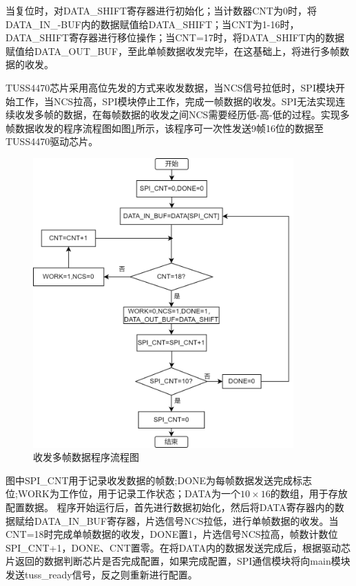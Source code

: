 当复位时，对DATA\_SHIFT寄存器进行初始化；当计数器CNT为0时，将DATA\_IN\_-BUF内的数据赋值给DATA\_SHIFT；当CNT为1-16时，DATA\_SHIFT寄存器进行移位操作；当CNT=17时，将DATA\_SHIFT内的数据赋值给DATA\_OUT\_BUF，至此单帧数据收发完毕，在这基础上，将进行多帧数据的收发。




TUSS4470芯片采用高位先发的方式来收发数据，当NCS信号拉低时，SPI模块开始工作，当NCS拉高，SPI模块停止工作，完成一帧数据的收发。SPI无法实现连续收发多帧的数据，在每帧数据的收发之间NCS需要经历低-高-低的过程。实现多帧数据收发的程序流程图如图\ref{收发多帧数据程序流程图}所示，该程序可一次性发送9帧16位的数据至TUSS4470驱动芯片。
\begin{figure}[ht]
	\centering
	\includegraphics[width=10cm]{figure/SPI Program Flow Chart.png}
	\caption{收发多帧数据程序流程图}
	\label{收发多帧数据程序流程图}
\end{figure} 
图中SPI\_CNT用于记录收发数据的帧数;DONE为每帧数据发送完成标志位;WORK为工作位，用于记录工作状态；DATA为一个$10\times16$的数组，用于存放配置数据。
程序开始运行后，首先进行数据初始化，然后将DATA寄存器内的数据赋给DATA\_IN\_BUF寄存器，片选信号NCS拉低，进行单帧数据的收发。当CNT=18时完成单帧数据的收发，DONE置1，片选信号NCS拉高，帧数计数位SPI\_CNT+1，DONE、CNT置零。在将DATA内的数据发送完成后，根据驱动芯片返回的数据判断芯片是否完成配置，如果完成配置，SPI通信模块将向main模块发送tuss\_ready信号，反之则重新进行配置。





\noindent

